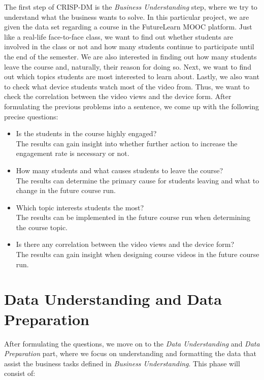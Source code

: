 \documentclass[12pt,]{article}
\providecommand{\tightlist}{%
\setlength{\itemsep}{0pt}\setlength{\parskip}{0pt}}
\begin{document}
The first step of CRISP-DM is the \emph{Business Understanding} step,
where we try to understand what the business wants to solve. In this
particular project, we are given the data set regarding a course in the
FutureLearn MOOC platform. Just like a real-life face-to-face class, we
want to find out whether students are involved in the class or not and
how many students continue to participate until the end of the semester.
We are also interested in finding out how many students leave the course
and, naturally, their reason for doing so. Next, we want to find out
which topics students are most interested to learn about. Lastly, we
also want to check what device students watch most of the video from.
Thus, we want to check the correlation between the video views and the
device form. After formulating the previous problems into a sentence, we
come up with the following precise questions:

\begin{itemize}
\tightlist
\item
  Is the students in the course highly engaged?\\
  The results can gain insight into whether further action to increase
  the engagement rate is necessary or not.
\item
  How many students and what causes students to leave the course?\\
  The results can determine the primary cause for students leaving and
  what to change in the future course run.
\item
  Which topic interests students the most?\\
  The results can be implemented in the future course run when
  determining the course topic.
\item
  Is there any correlation between the video views and the device
  form?\\
  The results can gain insight when designing course videos in the
  future course run.
\end{itemize}

\hypertarget{data-understanding-and-data-preparation}{%
\section{Data Understanding and Data
Preparation}\label{data-understanding-and-data-preparation}}

After formulating the questions, we move on to the \emph{Data
Understanding} and \emph{Data Preparation} part, where we focus on
understanding and formatting the data that assist the business tasks
defined in \emph{Business Understanding}. This phase will consist of:
\end{document}
